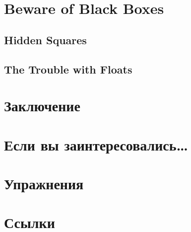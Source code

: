 \section{Beware of Black Boxes}
\subsection{Hidden Squares}
\subsection{The Trouble with Floats}
\section{Заключение}
\section{Если вы заинтересовались…}
\section{Упражнения}
\section{Ссылки}





